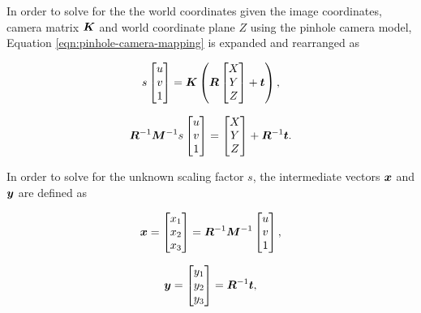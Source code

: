 In order to solve for the the world coordinates given the image coordinates, camera matrix $\bm{K}$ and world coordinate plane $Z$ using the pinhole camera model, Equation \ref{eqn:pinhole-camera-mapping} is expanded and rearranged as

\begin{equation}
	s
	\begin{bmatrix}
		u \\ 
		v \\ 
		1
	\end{bmatrix}
	=
	\bm{K}\left(\bm{R}
	\begin{bmatrix}
		X \\ 
		Y \\ 
		Z
	\end{bmatrix}
	+ \bm{t}\right),
	\label{eqn:expanded-pinhole-camera-mapping1}
\end{equation}

\begin{equation}
	\bm{R}^{-1}\bm{M}^{-1}
	s
	\begin{bmatrix}
		u \\ 
		v \\ 
		1
	\end{bmatrix}
	=
	\begin{bmatrix}
		X \\ 
		Y \\ 
		Z
	\end{bmatrix}
	+ \bm{R}^{-1}\bm{t}.
	\label{eqn:expanded-pinhole-camera-mapping2}
\end{equation}

In order to solve for the unknown scaling factor $s$, the intermediate vectors $\bm{x}$ and $\bm{y}$ are defined as

\begin{equation}
	\bm{x}=
	\begin{bmatrix}
		x_1 \\ 
		x_2 \\ 
		x_3
	\end{bmatrix}
=
	\bm{R}^{-1}\bm{M}^{-1}
	\begin{bmatrix}
		u \\ 
		v \\ 
		1
	\end{bmatrix},
	\label{eqn:expanded-pinhole-camera-mapping-left-matrix}
\end{equation}

\begin{equation}
	\bm{y}
	=
	\begin{bmatrix}
		y_1 \\ 
		y_2 \\ 
		y_3
	\end{bmatrix}
	=
	\bm{R}^{-1}\bm{t},
	\label{eqn:expanded-pinhole-camera-mapping-right-matrix}
\end{equation}

